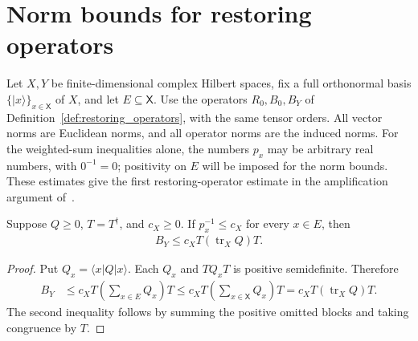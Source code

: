 \section{Norm bounds for restoring operators}
\label{sec:restoring_norm}

Let $X,Y$ be finite-dimensional complex Hilbert spaces, fix a full
orthonormal basis $\{|x\rangle\}_{x\in\mathsf X}$ of $X$, and let
$E\subseteq\mathsf X$. Use the operators $R_0,B_0,B_Y$ of
Definition~\ref{def:restoring_operators}, with the same tensor orders.
All vector norms are Euclidean norms, and all operator norms are the
induced norms. For the weighted-sum inequalities alone, the numbers
$p_x$ may be arbitrary real numbers, with $0^{-1}=0$; positivity on $E$
will be imposed for the norm bounds. These estimates give the first
restoring-operator estimate in the amplification argument
of~\cite{OpenAI2026AreaLaw}.

\begin{theorem}
    \label{thm:restoring_selected_trace}
    \leanok
    Suppose $Q\ge0$, $T=T^\dagger$, and $c_X\ge0$.
    If $p_x^{-1}\le c_X$ for every $x\in E$, then
    \begin{align}
        B_Y\le c_X T(\operatorname{tr}_X Q)T.
        \label{eq:restoring_selected_trace}
    \end{align}
\end{theorem}
\begin{proof}\leanok
    Put $Q_x=\langle x|Q|x\rangle$. Each $Q_x$ and $TQ_xT$ is
    positive semidefinite. Therefore
    \begin{align*}
        B_Y
        &\le c_X T\left(\sum_{x\in E}Q_x\right)T
        \le c_X T\left(\sum_{x\in\mathsf X}Q_x\right)T
        =c_X T(\operatorname{tr}_X Q)T.
    \end{align*}
    The second inequality follows by summing the positive omitted blocks
    and taking congruence by $T$.
\end{proof}

